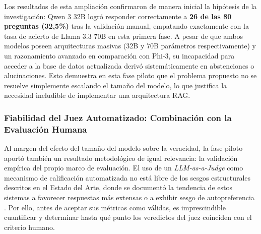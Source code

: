 \begin{table}[ht]
\centering
{}
\caption{Resultados de la prueba piloto añadiendo Qwen 3 32B.}
\label{tab:piloto_80_con_qwen}
\end{table}

Los resultados de esta ampliación confirmaron de manera inicial la hipótesis de la investigación: Qwen 3 32B logró responder correctamente a \textbf{26 de las 80 preguntas (32,5\%)} tras la validación manual, empatando exactamente con la tasa de acierto de Llama 3.3 70B en esta primera fase. A pesar de que ambos modelos poseen arquitecturas masivas (32B y 70B parámetros respectivamente) y un razonamiento avanzado en comparación con Phi-3, su incapacidad para acceder a la base de datos actualizada derivó sistemáticamente en abstenciones o alucinaciones. Esto demuestra en esta fase piloto que el problema propuesto no se resuelve simplemente escalando el tamaño del modelo, lo que justifica la necesidad ineludible de implementar una arquitectura RAG.

\subsubsection{Fiabilidad del Juez Automatizado: Combinación con la Evaluación Humana}

Al margen del efecto del tamaño del modelo sobre la veracidad, la fase piloto aportó también un resultado metodológico de igual relevancia: la validación empírica del propio marco de evaluación. El uso de un \textit{LLM-as-a-Judge} como mecanismo de calificación automatizada no está libre de los sesgos estructurales descritos en el Estado del Arte, donde se documentó la tendencia de estos sistemas a favorecer respuestas más extensas o a exhibir sesgo de autopreferencia \cite{zheng2023judging}. Por ello, antes de aceptar sus métricas como válidas, es imprescindible cuantificar y determinar hasta qué punto los veredictos del juez coinciden con el criterio humano.

